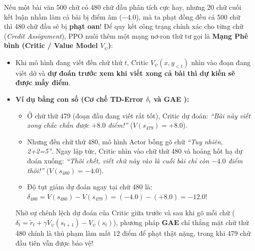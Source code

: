 \begin{debate}
Nếu một bài văn 500 chữ có 480 chữ đầu phân tích cực hay, nhưng 20 chữ cuối kết luận nhầm làm cả bài bị điểm âm ($-4.0$), mà ta phạt đồng đều cả 500 chữ thì 480 chữ đầu sẽ bị \textbf{phạt oan}!
Để quy kết công trạng chính xác cho từng chữ (\textit{Credit Assignment}), PPO nuôi thêm một mạng nơ-ron thứ tư gọi là \textbf{Mạng Phê bình (Critic / Value Model $V_\psi$)}:
\begin{itemize}[leftmargin=1.2cm]
    \item Khi mô hình đang viết đến chữ thứ $t$, Critic $V_\psi(x, y_{<t})$ nhìn vào đoạn đang viết dở và \textbf{dự đoán trước xem khi viết xong cả bài thì dự kiến sẽ được mấy điểm}.
    \item \textbf{Ví dụ bằng con số (Cơ chế TD-Error $\delta_t$ và GAE \citealt{schulman2016high}):}
    \begin{itemize}
        \item Ở chữ thứ 479 (đoạn đầu đang viết rất tốt), Critic dự đoán: \textit{``Bài này viết xong chắc chắn được $\mathbf{+8.0}$ điểm!''} ($V(s_{479}) = +8.0$).
        \item Nhưng đến chữ thứ 480, mô hình Actor bỗng gõ chữ \textit{``Tuy nhiên, 2+2=5''}. Ngay lập tức, Critic nhìn vào chữ thứ 480 và hoảng hốt hạ dự đoán xuống: \textit{``Thôi chết, viết chữ này vào là cuối bài chỉ còn $\mathbf{-4.0}$ điểm thôi!''} ($V(s_{480}) = -4.0$).
        \item Độ tụt giảm dự đoán ngay tại chữ 480 là: $\delta_{480} = V(s_{480}) - V(s_{479}) = (-4.0) - (+8.0) = \mathbf{-12.0}$!
    \end{itemize}
    Nhờ sự chênh lệch dự đoán của Critic giữa trước và sau khi gõ mỗi chữ ($\delta_t = \tilde{r}_t + \gamma V_\psi(s_{t+1}) - V_\psi(s_t)$), phương pháp \textbf{GAE} chỉ thẳng mặt chữ thứ 480 chính là thủ phạm làm mất $12$ điểm để phạt thật nặng, trong khi 479 chữ đầu tiên vẫn được bảo vệ!
\end{itemize}
\end{debate}

